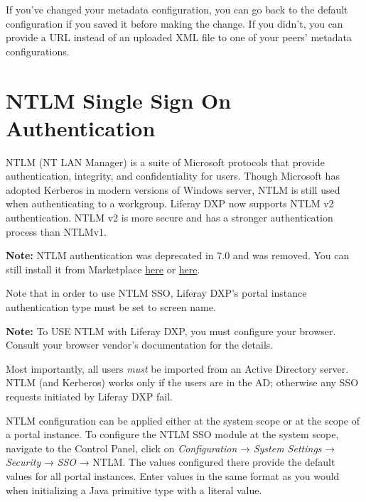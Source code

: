\noindent\hrulefill

If you've changed your metadata configuration, you can go back to the
default configuration if you saved it before making the change. If you
didn't, you can provide a URL instead of an uploaded XML file to one of
your peers' metadata configurations.

\chapter{NTLM Single Sign On
Authentication}\label{ntlm-single-sign-on-authentication}

NTLM (NT LAN Manager) is a suite of Microsoft protocols that provide
authentication, integrity, and confidentiality for users. Though
Microsoft has adopted Kerberos in modern versions of Windows server,
NTLM is still used when authenticating to a workgroup. Liferay DXP now
supports NTLM v2 authentication. NTLM v2 is more secure and has a
stronger authentication process than NTLMv1.

\noindent\hrulefill

\textbf{Note:} NTLM authentication was deprecated in 7.0 and was
removed. You can still install it from Marketplace
\href{https://web.liferay.com/marketplace/-/mp/application/125668266}{here}
or
\href{https://web.liferay.com/marketplace/-/mp/application/125668305}{here}.

\noindent\hrulefill

Note that in order to use NTLM SSO, Liferay DXP's portal instance
authentication type must be set to screen name.

\noindent\hrulefill

\textbf{Note:} To USE NTLM with Liferay DXP, you must configure your
browser. Consult your browser vendor's documentation for the details.

\noindent\hrulefill

Most importantly, all users \emph{must} be imported from an Active
Directory server. NTLM (and Kerberos) works only if the users are in the
AD; otherwise any SSO requests initiated by Liferay DXP fail.

NTLM configuration can be applied either at the system scope or at the
scope of a portal instance. To configure the NTLM SSO module at the
system scope, navigate to the Control Panel, click on
\emph{Configuration} → \emph{System Settings} → \emph{Security} →
\emph{SSO} → NTLM. The values configured there provide the default
values for all portal instances. Enter values in the same format as you
would when initializing a Java primitive type with a literal value.

